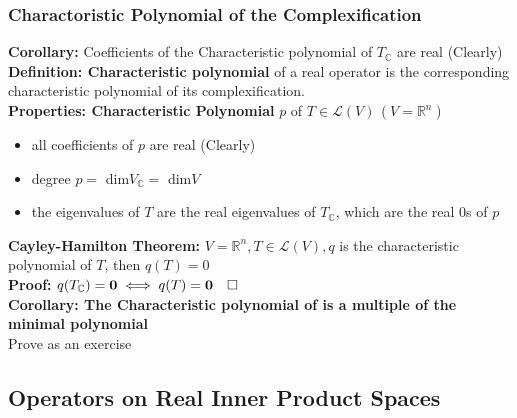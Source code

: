 \documentclass{article}
\newcommand{\R}{\mathbb{R}}
\newcommand{\0}{{\bf{0}}}
\begin{document}
\subsubsection{Charactoristic Polynomial of the Complexification}
\textbf{Corollary:} Coefficients of the Characteristic polynomial of $T_\mathbb{C}$ are real (Clearly)\\
\textbf{Definition: Characteristic polynomial} of a real operator is the corresponding characteristic polynomial of its complexification.\\
\textbf{Properties: Characteristic Polynomial} $p$ of $T\in\mathcal{L}(V)\,(V=\R^n)$
\begin{itemize}
    \item all coefficients of $p$ are real (Clearly)
    \item degree $p=$ dim$V_\mathbb{C}=$ dim$V$
    \item the eigenvalues of $T$ are the real eigenvalues of $T_\mathbb{C}$, which are the real 0s of $p$
\end{itemize}
\textbf{Cayley-Hamilton Theorem:} $V=\R^n,T\in\mathcal{L}(V),q$ is the characteristic polynomial of $T$, then $q(T)=0$\\
\textbf{Proof:} $q(T_\mathbb{C})=\0\iff q(T)=\0\quad\square$\\
\textbf{Corollary: The Characteristic polynomial of is a multiple of the minimal polynomial}\\
\null\hfill{Prove as an exercise}
\subsection{Operators on Real Inner Product Spaces}
\end{document}
